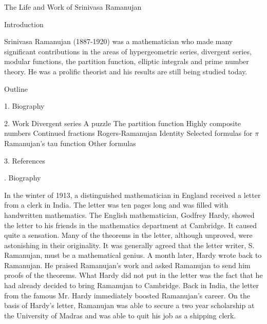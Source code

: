 \centerline{The Life and Work of Srinivasa Ramanujan}

\beginsection Introduction

Srinivasa Ramanujan (1887-1920) was a mathematician who made
many significant contributions in the areas of hypergeometric series,
divergent series, modular functions, the partition function,
elliptic integrals and prime
number theory.
He was a prolific theorist and his results are still being studied
today.

\beginsection Outline

\item{1.}
Biography
\item{2.}
Work
 Divergent series
 A puzzle
 The partition function
 Highly composite numbers
 Continued fractions
 Rogers-Ramanujan Identity
 Selected formulas for $\pi$
 Ramanujan's tau function
 Other formulas
\item{3.}
References

. Biography

In the winter of 1913, a distinguished mathematician in England
received a letter from a clerk in India.
The letter was ten pages long and was filled with handwritten
mathematics.
The English mathematician, Godfrey Hardy, showed the letter to his friends in the
mathematics department at Cambridge.
It caused quite a sensation.
Many of the theorems in the letter, although unproved,
were astonishing in their originality.
It was generally agreed that the letter writer, S. Ramanujan,
must be a mathematical genius.
A month later, Hardy wrote back to Ramanujan.
He praised Ramanujan's work and asked Ramanujan to send him
proofs of the theorems.
What Hardy did not put in the letter was the fact that he
had already decided to bring Ramanujan to Cambridge.
Back in India, the letter from the famous Mr. Hardy immediately
boosted Ramanujan's career.
On the basis of Hardy's letter,
Ramanujan was able to secure a two year scholarship at the University of
Madras and was able to quit his job as a shipping clerk.

